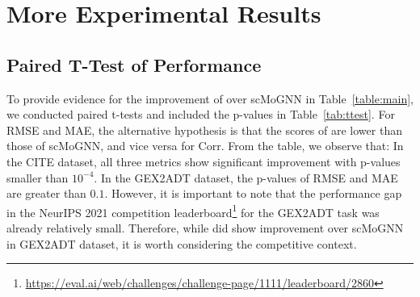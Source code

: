 


\section{More Experimental Results}

\iffalse
\subsection{Paired T-Test of Performance}
To provide evidence for the improvement of \method{} over scMoGNN in Table~\ref{table:main}, we conducted paired t-tests and included the p-values in Table~\ref{tab:ttest}. For RMSE and MAE, the alternative hypothesis is that the scores of \method{} are lower than those of scMoGNN, and vice versa for Corr. From the table, we observe that: In the CITE dataset, all three metrics show significant improvement with p-values smaller than $10^{-4}$. In the GEX2ADT dataset, the p-values of RMSE and MAE are greater than $0.1$. However, it is important to note that the performance gap in the NeurIPS 2021 competition leaderboard\footnote{\url{https://eval.ai/web/challenges/challenge-page/1111/leaderboard/2860}} for the GEX2ADT task was already relatively small. 
Therefore, while \method{} did show improvement over scMoGNN in GEX2ADT dataset, it is worth considering the competitive context.

